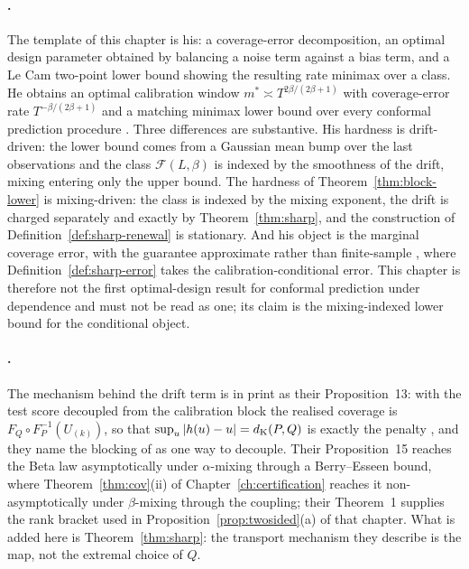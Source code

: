 \documentclass[../../../main.tex]{subfiles}
\begin{document}
\paragraph{\citet{halkiewicz2026}.} The template of this chapter is his: a coverage-error decomposition, an optimal design parameter obtained by balancing a noise term against a bias term, and a Le Cam two-point lower bound showing the resulting rate minimax over a class. He obtains an optimal calibration window $m^*\asymp T^{2\beta/(2\beta+1)}$ with coverage-error rate $T^{-\beta/(2\beta+1)}$ \citep[Sect.~3.4, eq.~(6)]{halkiewicz2026} and a matching minimax lower bound over every conformal prediction procedure \citep[Thm.~4]{halkiewicz2026}. Three differences are substantive. His hardness is drift-driven: the lower bound comes from a Gaussian mean bump over the last observations and the class $\mathcal F(L,\beta)$ is indexed by the smoothness of the drift, mixing entering only the upper bound. The hardness of Theorem~\ref{thm:block-lower} is mixing-driven: the class is indexed by the mixing exponent, the drift is charged separately and exactly by Theorem~\ref{thm:sharp}, and the construction of Definition~\ref{def:sharp-renewal} is stationary. And his object is the marginal coverage error, with the guarantee approximate rather than finite-sample \citep[Remark~3]{halkiewicz2026}, where Definition~\ref{def:sharp-error} takes the calibration-conditional error. This chapter is therefore not the first optimal-design result for conformal prediction under dependence and must not be read as one; its claim is the mixing-indexed lower bound for the conditional object.

\paragraph{\citet{ramos2026}.} The mechanism behind the drift term is in print as their Proposition~13: with the test score decoupled from the calibration block the realised coverage is $F_Q\circ F_P^{-1}(U_{(k)})$, so that $\sup_u|h(u)-u|=d_{\mathrm{K}}(P,Q)$ is exactly the penalty \citep[Prop.~13, p.~11]{ramos2026}, and they name the blocking of \citet{yu1994} as one way to decouple. Their Proposition~15 reaches the Beta law asymptotically under $\alpha$-mixing through a Berry--Esseen bound, where Theorem~\ref{thm:cov}(ii) of Chapter~\ref{ch:certification} reaches it non-asymptotically under $\beta$-mixing through the coupling; their Theorem~1 supplies the rank bracket used in Proposition~\ref{prop:twosided}(a) of that chapter. What is added here is Theorem~\ref{thm:sharp}: the transport mechanism they describe is the map, not the extremal choice of $Q$.
\end{document}
